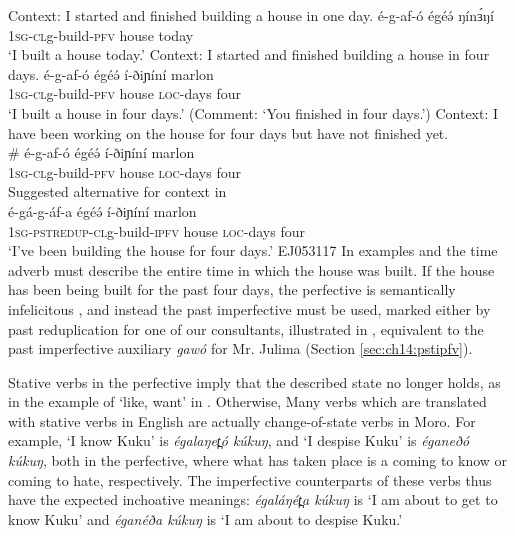 \ea \ea Context: I started and finished building a house in one day.  \label{ex:ch11:perfacha}
\gll é-g-af-ó égéə́    ŋínɜ́ŋí\\
\textsc{1sg}-\textsc{cl}g-build-\textsc{pfv} house today\\
\glt `I built a house today.'
\ex Context: I started and finished building a house in four days.  \label{ex:ch11:perfachb}
\gll é-g-af-ó égéə́    í-ðiɲíní marlon\\
\textsc{1sg}-\textsc{cl}g-build-\textsc{pfv} house \textsc{loc}-days four\\
\glt `I built a house in four days.' (Comment: `You finished in four days.')
\ex Context: I have been working on the house for four days but have not finished yet. \label{ex:ch11:perfachc}\\
\gll \# é-g-af-ó égéə́    í-ðiɲíní marlon\\
{} \textsc{1sg}-\textsc{cl}g-build-\textsc{pfv} house \textsc{loc}-days four\\
\ex Suggested alternative for context in   \label{ex:ch11:perfachc}\\
\gll é-gá-g-áf-a égéə́    í-ðiɲíní marlon\\
\textsc{1sg}-\textsc{pstredup}-\textsc{cl}g-build-\textsc{ipfv} house \textsc{loc}-days four\\
\glt `I've been building the house for four days.'  \hfill EJ053117
\z 
\z
In examples  and  the time adverb must describe the entire time in which the house was built. If the house has been being built for the past four days, the perfective is semantically infelicitous , and instead the past imperfective must be used, marked either by past reduplication for one of our consultants, illustrated in , equivalent to the past imperfective auxiliary \textit{gawó} for Mr. Julima (Section \ref{sec:ch14:pstipfv}). 

Stative verbs in the perfective imply that the described state no longer holds, as in the example of `like, want' in . Otherwise, Many verbs which are translated with stative verbs in English are actually change-of-state verbs in Moro. For example, `I know Kuku' is \textit{égalaŋet̪ó kúkuŋ}, and `I despise Kuku' is \textit{éganeðó kúkuŋ}, both in the perfective, where what has taken place is a coming to know or coming to hate, respectively. The imperfective counterparts of these verbs thus have the expected inchoative meanings:  \textit{égaláŋét̪a kúkuŋ} is `I am about to get to know Kuku' and \textit{éganéða kúkuŋ} is `I am about to despise Kuku.' 

